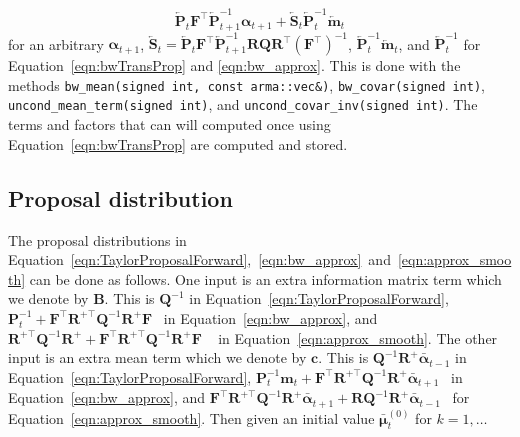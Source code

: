 \documentclass[notitlepage]{article}
\renewcommand{\vec}[1]{\bm{#1}}
\newcommand{\vecb}[1]{\bar{\vec{#1}}}
\newcommand{\vecLarrow}[1]{\overleftarrow{\vec{#1}}}
\newcommand{\mat}[1]{\mathbf{#1}}
\newcommand{\matLarrow}[1]{\overleftarrow{\mat{#1}}}
\newcommand{\Lparen}[1]{\left( #1\right)}
\begin{document}
%
$$
	\matLarrow{P}_t\mat{F}^\top\matLarrow{P}_{t + 1}^{-1}\vec{\alpha}_{t+1}
		+ \matLarrow{S}_t\matLarrow{P}_t^{-1} \vecLarrow{m}_t
$$%
%
for an arbitrary $\vec{\alpha}_{t+1}$, %
$\matLarrow{S}_t = \matLarrow{P}_t\mat{F}^\top\matLarrow{P}_{t + 1}^{-1}\mat{R}\mat{Q}\mat{R}^\top\Lparen{\mat{F}^\top}^{-1}$, %
$\matLarrow{P}_t^{-1}\vecLarrow{m}_t$, and $\matLarrow{P}_t^{-1}$ for Equation~\eqref{eqn:bwTransProp} and \eqref{eqn:bw_approx}. This is done with the methods 
\texttt{bw\_mean(signed int, const arma::vec\&)}, %
\texttt{bw\_covar(signed int)}, %
\texttt{uncond\_mean\_term(signed int)}, and \texttt{uncond\_covar\_inv(signed int)}. The terms and factors that can will computed once using Equation~\eqref{eqn:bwTransProp} are computed and stored.

\subsection{Proposal distribution}\label{sec:propos}
The proposal distributions in Equation~\eqref{eqn:TaylorProposalForward},~\eqref{eqn:bw_approx}~and~\eqref{eqn:approx_smooth} can be done as follows. One input is an extra information matrix term which we denote by $\mat{B}$. This is $\mat{Q}^{-1}$ in Equation~\eqref{eqn:TaylorProposalForward}, %
$\mat{P}_t^{-1} + \mat{F}^\top\mat{R}^{+\top}\mat{Q}^{-1}\mat{R}^+\mat{F}$%
~in Equation~\eqref{eqn:bw_approx}, and \\%
$\mat{R}^{+\top}\mat{Q}^{-1}\mat{R}^+ + \mat{F}^\top\mat{R}^{+\top}\mat{Q}^{-1}\mat{R}^+\mat{F}$%
~ in Equation~\eqref{eqn:approx_smooth}. The other input is an extra mean term which we denote by $\vec{c}$. This is $\mat{Q}^{-1}\mat{R}^+\vecb{\alpha}_{t-1}$ in Equation~\eqref{eqn:TaylorProposalForward}, %
$\mat{P}_t^{-1}\vec{m}_t + \mat{F}^\top\mat{R}^{+\top}\mat{Q}^{-1}\mat{R}^+\vecb{\alpha}_{t+1}$%
~in Equation~\eqref{eqn:bw_approx}, and %
$\mat{F}^\top\mat{R}^{+\top}\mat{Q}^{-1}\mat{R}^+\vecb{\alpha}_{t+1} + 
	\mat{R}\mat{Q}^{-1}\mat{R}^+\vecb{\alpha}_{t-1}$~ for Equation~\eqref{eqn:approx_smooth}. Then given an initial value $\vecb{\mu}_t^{(0)}$ for $k = 1, \dots$%
%
\end{document}
